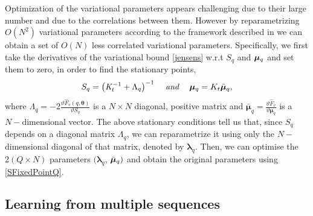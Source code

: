 \documentclass{article} %
\begin{document}
Optimization of the variational parameters appears challenging due to
their large number and due to the correlations between them. However by
reparametrizing $O \left( N^2 \right)$ variational parameters
according to the framework described in
\cite{OpperFixedPointCovariance} we can obtain a set of $O(N)$ 
less correlated variational parameters. Specifically, we first take the derivatives of the variational bound \eqref{jensens} w.r.t $S_q$ and $\boldsymbol \mu_q$ and set them to zero, in order to find the stationary points,
\begin{equation}
S_q = \left( \mathit{K}_t^{-1} + \Lambda_q \right)^{-1} \;\;\; \mbox{ \textit{and} } \;\;\;  \boldsymbol \mu_q = K_t \bar{\boldsymbol \mu}_q, \label{SFixedPointQ}
\end{equation}
where $\Lambda_q = - 2\frac{\vartheta \mathit{\hat{F}_v(q, \boldsymbol
    \theta)}}{\vartheta \mathit{S_q}}$ is a $N \times N$ diagonal,
positive matrix and $\bar{\boldsymbol \mu}_q = \frac{\vartheta
  \hat{F}_v}{\vartheta \boldsymbol \mu_q}$ is a $N-$dimensional
vector.
The above stationary conditions tell us that, since 
$S_q$ depends on a diagonal matrix $\Lambda_q$, 
we can reparametrize it using only the $N-$dimensional diagonal of that matrix, denoted by $\boldsymbol \lambda_q$.
Then, we can optimise the $2 (Q \times N)$ parameters $( \boldsymbol \lambda_q$, $\bar{\boldsymbol \mu}_q)$ and obtain the original parameters using \eqref{SFixedPointQ}.



\subsection{Learning from multiple sequences \label{sequences}}
\end{document}
